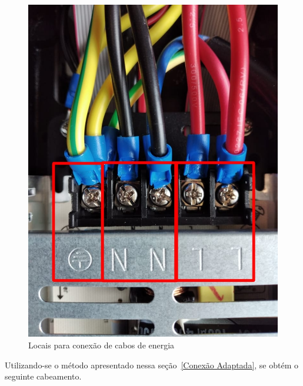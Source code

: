 \documentclass[12pt, a4paper]{article}
\begin{document}
\begin{figure}[!htb]
	\centering
	\includegraphics[width=.9\textwidth]{painel1Cp.jpeg}
	\caption{\label{fig:}Locais para conexão de cabos de energia}
\end{figure}

\newpage

Utilizando-se o método apresentado nessa seção~\ref{Conexão Adaptada}, se obtém o seguinte cabeamento.
\end{document}
